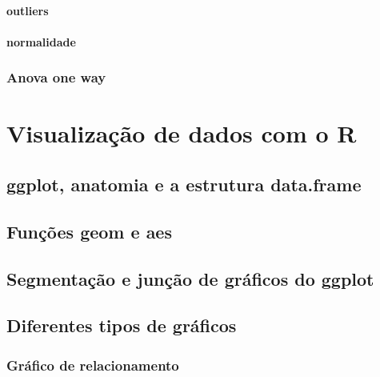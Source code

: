 \documentclass[
]{book}
\begin{document}
\hypertarget{outliers}{%
\subsubsection{outliers}\label{outliers}}

\hypertarget{normalidade}{%
\subsubsection{normalidade}\label{normalidade}}

\hypertarget{anova-one-way}{%
\subsection{Anova one way}\label{anova-one-way}}

\hypertarget{visu}{%
\chapter{Visualização de dados com o R}\label{visu}}

\hypertarget{ggplot-anatomia-e-a-estrutura-data.frame}{%
\section{ggplot, anatomia e a estrutura data.frame}\label{ggplot-anatomia-e-a-estrutura-data.frame}}

\hypertarget{funuxe7uxf5es-geom-e-aes}{%
\section{Funções geom e aes}\label{funuxe7uxf5es-geom-e-aes}}

\hypertarget{segmentauxe7uxe3o-e-junuxe7uxe3o-de-gruxe1ficos-do-ggplot}{%
\section{Segmentação e junção de gráficos do ggplot}\label{segmentauxe7uxe3o-e-junuxe7uxe3o-de-gruxe1ficos-do-ggplot}}

\hypertarget{diferentes-tipos-de-gruxe1ficos}{%
\section{Diferentes tipos de gráficos}\label{diferentes-tipos-de-gruxe1ficos}}

\hypertarget{gruxe1fico-de-relacionamento}{%
\subsection{Gráfico de relacionamento}\label{gruxe1fico-de-relacionamento}}
\end{document}
